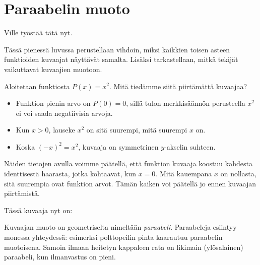 \chapter{Paraabelin muoto}

Ville työstää tätä nyt.

Tässä pienessä luvussa perustellaan vihdoin, miksi kaikkien toisen asteen funktioiden
kuvaajat näyttävät samalta. Lisäksi tarkastellaan, mitkä tekijät vaikuttavat kuvaajien
muotoon.

Aloitetaan funktiosta $P(x)=x^2$. Mitä tiedämme siitä piirtämättä kuvaajaa?
\begin{itemize}
\item Funktion pienin arvo on $P(0) = 0$, sillä tulon merkkisäännön perusteella $x^2$ ei voi saada negatiivisia arvoja.
\item Kun $x > 0$, lauseke $x^2$  on sitä
suurempi, mitä suurempi $x$ on.
\item Koska $(-x)^2 = x^2$, kuvaaja on symmetrinen $y$-akselin suhteen. 
\end{itemize}  

Näiden tietojen avulla voimme päätellä, että funktion kuvaaja koostuu kahdesta
identtisestä haarasta, jotka kohtaavat, kun $x=0$. Mitä kauempana $x$ on nollasta,
sitä suurempia ovat funktion arvot. Tämän kaiken voi päätellä jo ennen kuvaajan
piirtämistä.

Tässä kuvaaja nyt on:
\begin{center}
\begin{kuvaajapohja}{2}{-2}{2}{-1}{4}
\end{kuvaajapohja}
\end{center}
Kuvaajan muoto on geometriselta nimeltään \emph{paraabeli}. Paraabeleja esiintyy monessa yhteydessä: esimerksi polttopeilin pinta kaarautuu paraabelin muotoisena. Samoin ilmaan heitetyn kappaleen
rata on likimain (ylösalainen) paraabeli, kun ilmanvastus on pieni.

